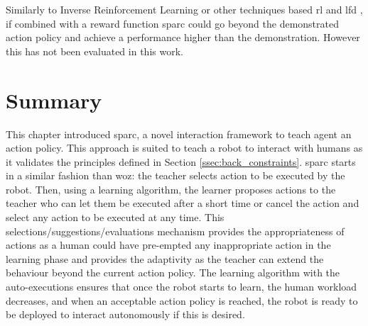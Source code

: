 Similarly to Inverse Reinforcement Learning \citep{abbeel2004apprenticeship} or other techniques based \gls{rl} and \gls{lfd} \citep{billard2008robot}, if combined with a reward function \gls{sparc} could go beyond the demonstrated action policy and achieve a performance higher than the demonstration. However this has not been evaluated in this work.

\section{Summary}
    
This chapter introduced \acrfull{sparc}, a novel interaction framework to teach agent an action policy. This approach is suited to teach a robot to interact with humans as it validates the principles defined in Section \ref{ssec:back_constraints}. \gls{sparc} starts in a similar fashion than \gls{woz}: the teacher selects action to be executed by the robot. Then, using a learning algorithm, the learner proposes actions to the teacher who can let them be executed after a short time or cancel the action and select any action to be executed at any time. This selections/suggestions/evaluations mechanism provides the appropriateness of actions as a human could have pre-empted any inappropriate action in the learning phase and provides the adaptivity as the teacher can extend the behaviour beyond the current action policy. The learning algorithm with the auto-executions ensures that once the robot starts to learn, the human workload decreases, and when an acceptable action policy is reached, the robot is ready to be deployed to interact autonomously if this is desired.
